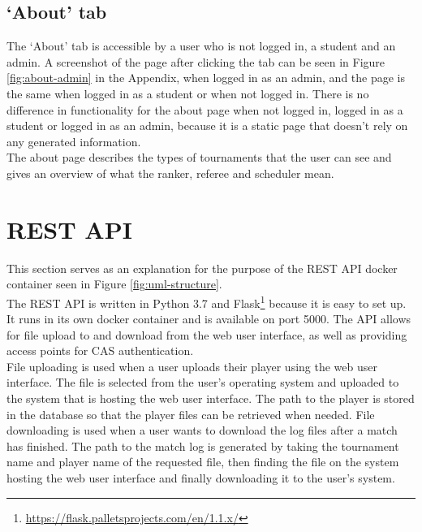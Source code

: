 \documentclass[a4paper, 11pt]{report}
\begin{document}
\subsection{`About' tab}
\label{sec:impl-tab-about}

The `About' tab is accessible by a user who is not logged in, a student
and an admin. A screenshot of the page after clicking the tab can be seen in
Figure \ref{fig:about-admin} in the Appendix, when logged in as an admin,
and the page is the same when logged in as a student or when not logged in.
There is no difference in functionality for the about page when not logged in,
logged in as a student or logged in as an admin, because it is a static page
that doesn't rely on any generated information. \\

The about page describes the types of tournaments that the user can see and
gives an overview of what the ranker, referee and scheduler mean.

\section{REST API}

This section serves as an explanation for the purpose of the REST API docker
container seen in Figure \ref{fig:uml-structure}. \\

The REST API is written in Python 3.7 and Flask\footnote{\url{https://flask.palletsprojects.com/en/1.1.x/}}
because it is easy to set up. It runs in its own docker container and is
available on port 5000. The API allows for file upload to and download from the
web user interface, as well as providing access points for CAS authentication. \\

File uploading is used when a user uploads their player using the web user
interface. The file is selected from the user's operating system and uploaded
to the system that is hosting the web user interface. The path to the player
is stored in the database so that the player files can be retrieved when needed.
File downloading is used when a user wants to download the log files after
a match has finished. The path to the match log is generated by taking the
tournament name and player name of the requested file, then finding the file on
the system hosting the web user interface and finally downloading it to the user's
system. \\
\end{document}
